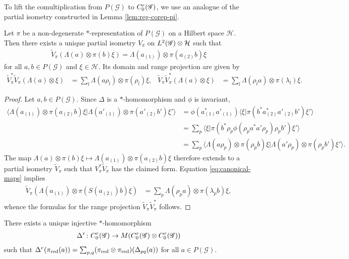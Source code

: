 To lift the comultiplication from $P(\mathscr{G})$ to $C^{r}_{0}(\mathscr{G})$, we use an analogue of the partial isometry constructed in Lemma \ref{lem:reg-corep-pi}.
\begin{Lem} \label{lemma:partial-isometry}
  Let  $\pi$ be a non-degenerate $*$-representation of  $P(\mathscr{G})$ on a Hilbert space $\mathcal{H}$. Then there exists  a unique partial isometry $V_{\pi}$ on $L^{2}(\mathscr{G}) \otimes \mathcal{H}$  such that
  \begin{align*}
    \tilde{V}_{\pi}(\Lambda(a) \otimes \pi(b)\xi) = \Lambda(a_{(1)}) \otimes
    \pi(a_{(2)}b) \xi
  \end{align*}
  for all $a,b\in P(\mathscr{G})$ and $\xi \in \mathcal{H}$. Its domain and range projection are given by
\begin{align*}
  \tilde{V}_{\pi}^{*}\tilde{V}_{\pi}(\Lambda(a)\otimes \xi) &= \sum_{l} \Lambda(a\rho_{l}) \otimes \pi(\rho_{l})\xi, &
  \tilde{V}_{\pi}\tilde{V}_{\pi}^{*}(\Lambda(a)\otimes \xi) &= \sum_{l}  \Lambda(\rho_{l}a) \otimes \pi(\lambda_{l})\xi.
\end{align*}
\end{Lem}
\begin{proof}
  Let $a,b \in P(\mathscr{G})$. Since $\Delta$ is a $*$-homomorphism and $\phi$ is
invariant,
  \begin{align*}
    \langle \Lambda(a_{(1)}) \otimes
    \pi(a_{(2)}b)\xi|\Lambda(a'_{(1)}) \otimes
    \pi(a'_{(2)}b')\xi'\rangle &=
    \phi(a_{(1)}^{*}a'_{(1)})\langle \xi|\pi(b^{*}a_{(2)}^{*}a'_{(2)}b')\xi'\rangle \\
    &= \sum_{p}
    \langle \xi|\pi(b^{*}\rho_{p}\phi(\rho_{p}a^{*}a'\rho_{p})\rho_{p}b')\xi'\rangle \\
    & =\sum_{p} \langle\Lambda(a\rho_{p}) \otimes \pi(\rho_{p}b)\xi |
    \Lambda(a'\rho_{p}) \otimes \pi(\rho_{p}b')\xi'\rangle.
  \end{align*}
  The map $\Lambda(a) \otimes \pi(b)\xi \mapsto \Lambda(a_{(1)})
  \otimes \pi(a_{(2)}b)\xi$ therefore extends to a partial isometry
  $\tilde{V}_{\pi}$ such that $V^{*}_{\pi}\tilde{V}_{\pi}$ has the claimed
  form. Equation  \eqref{eq:canonical-maps} implies
 \begin{align*}
 \tilde{V}_{\pi}(\Lambda(a_{(1)}) \otimes \pi(S(a_{(2)})b)\xi)   &=
 \sum_{p} \Lambda(\rho_{p}a) \otimes \pi(\lambda_{p}b)\xi,
 \end{align*}
whence the formulas for the range projection $\tilde{V}_{\pi}\tilde{V}_{\pi}^{*}$ follows.
\end{proof}
\begin{Lem} \label{lemma:delta-r}
 There exists a  unique injective $*$-homomorphism
\begin{align*}
  \Delta^{r}\colon
  C^{r}_{0}(\mathscr{G}) \to M(C^{r}_{0}(\mathscr{G}) \otimes
  C^{r}_{0}(\mathscr{G}))
\end{align*}
such that $\Delta^{r}(\pi_{\operatorname{\mathrm{red}}}(a)) =   \sum_{p,q} (\pi_{\operatorname{\mathrm{red}}} \otimes \pi_{\operatorname{\mathrm{red}}})(\Delta_{pq}(a))$ for all $a\in P(\mathscr{G})$.
\end{Lem}
